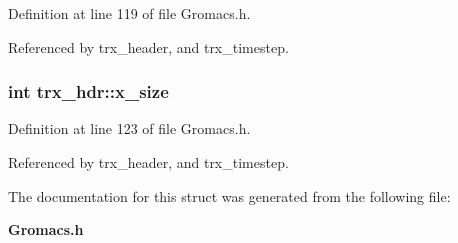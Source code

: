 Definition at line 119 of file Gromacs.h.

Referenced by trx\_\-header, and trx\_\-timestep.
\subsubsection{\setlength{\rightskip}{0pt plus 5cm}int trx\_\-hdr::x\_\-size}\label{structtrx__hdr_m9}




Definition at line 123 of file Gromacs.h.

Referenced by trx\_\-header, and trx\_\-timestep.

The documentation for this struct was generated from the following file:\begin{CompactItemize}
\item 
{\bf Gromacs.h}\end{CompactItemize}

